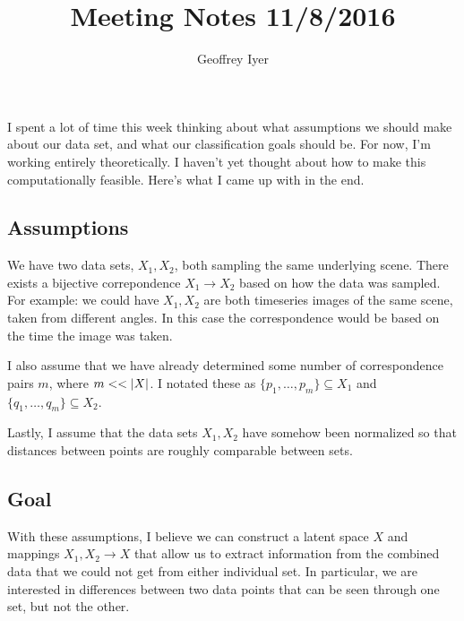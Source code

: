 
\newtheorem*{assumptions*}{Assumptions}
\newtheorem*{algorithm*}{Algorithm}
\usepackage{graphicx}



\title{Meeting Notes 11/8/2016}
\author{Geoffrey Iyer}
\maketitle

I spent a lot of time this week thinking about what assumptions we should make about our data set, and what our classification goals should be. For now, I'm working entirely theoretically. I haven't yet thought about how to make this computationally feasible. Here's what I came up with in the end.

\subsection*{Assumptions}
We have two data sets, $X_1,X_2$, both sampling the same underlying scene. There exists a bijective correpondence $X_1 \to X_2$ based on how the data was sampled. For example: we could have $X_1,X_2$ are both timeseries images of the same scene, taken from different angles. In this case the correspondence would be based on the time the image was taken.

I also assume that we have already determined some number of correspondence pairs $m$, where $m < < \left\lvert X\right\rvert$. I notated these as $\{p_1,\ldots,p_m\} \subseteq X_1$ and $\{q_1,\ldots,q_m\}\subseteq X_2$.

Lastly, I assume that the data sets $X_1, X_2$ have somehow been normalized so that distances between points are roughly comparable between sets.

\subsection*{Goal}
With these assumptions, I believe we can construct a latent space $X$ and mappings $X_1, X_2 \to X$ that allow us to extract information from the combined data that we could not get from either individual set. In particular, we are interested in differences between two data points that can be seen through one set, but not the other.

